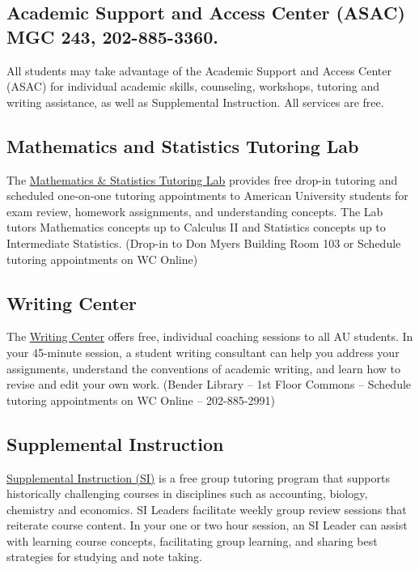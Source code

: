 \subsection{Academic Support and Access Center (ASAC) MGC 243,
202-885-3360.} All students may take advantage of the Academic
Support and Access Center (ASAC) for individual academic skills,
counseling, workshops, tutoring and writing assistance, as well
as Supplemental Instruction. All services are free.  

\subsection{Mathematics and Statistics Tutoring Lab} The \href{https://www.american.edu/provost/academic-access/mathstat.cfm}{Mathematics \& Statistics Tutoring Lab} provides free drop-in tutoring and scheduled one-on-one tutoring appointments to American University students for exam review, homework assignments, and understanding concepts. The Lab tutors Mathematics concepts up to Calculus II and Statistics concepts up to Intermediate Statistics. (Drop-in to Don Myers Building Room 103 or Schedule tutoring appointments on WC Online)

\subsection{Writing Center} The \href{https://www.american.edu/provost/academic-access/writing-center.cfm}{Writing Center} offers free, individual coaching sessions to all AU students. In your 45-minute session, a student writing consultant can help you address your assignments, understand the conventions of academic writing, and learn how to revise and edit your own work. (Bender Library – 1st Floor Commons – Schedule tutoring appointments on WC Online – 202-885-2991)

\subsection{Supplemental Instruction} \href{https://www.american.edu/provost/academic-access/supplemental-instruction-homepage.cfm}{Supplemental Instruction (SI)} is a free group tutoring program that supports historically challenging courses in disciplines such as accounting, biology, chemistry and economics. SI Leaders facilitate weekly group review sessions that reiterate course content. In your one or two hour session, an SI Leader can assist with learning course concepts, facilitating group learning, and sharing best strategies for studying and note taking. 

